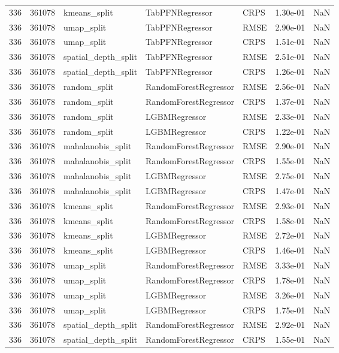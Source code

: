 \begin{tabular}{rrlllrr}
336 & 361078 & kmeans\_split & TabPFNRegressor & CRPS & 1.30e-01 & NaN \\
336 & 361078 & umap\_split & TabPFNRegressor & RMSE & 2.90e-01 & NaN \\
336 & 361078 & umap\_split & TabPFNRegressor & CRPS & 1.51e-01 & NaN \\
336 & 361078 & spatial\_depth\_split & TabPFNRegressor & RMSE & 2.51e-01 & NaN \\
336 & 361078 & spatial\_depth\_split & TabPFNRegressor & CRPS & 1.26e-01 & NaN \\
336 & 361078 & random\_split & RandomForestRegressor & RMSE & 2.56e-01 & NaN \\
336 & 361078 & random\_split & RandomForestRegressor & CRPS & 1.37e-01 & NaN \\
336 & 361078 & random\_split & LGBMRegressor & RMSE & 2.33e-01 & NaN \\
336 & 361078 & random\_split & LGBMRegressor & CRPS & 1.22e-01 & NaN \\
336 & 361078 & mahalanobis\_split & RandomForestRegressor & RMSE & 2.90e-01 & NaN \\
336 & 361078 & mahalanobis\_split & RandomForestRegressor & CRPS & 1.55e-01 & NaN \\
336 & 361078 & mahalanobis\_split & LGBMRegressor & RMSE & 2.75e-01 & NaN \\
336 & 361078 & mahalanobis\_split & LGBMRegressor & CRPS & 1.47e-01 & NaN \\
336 & 361078 & kmeans\_split & RandomForestRegressor & RMSE & 2.93e-01 & NaN \\
336 & 361078 & kmeans\_split & RandomForestRegressor & CRPS & 1.58e-01 & NaN \\
336 & 361078 & kmeans\_split & LGBMRegressor & RMSE & 2.72e-01 & NaN \\
336 & 361078 & kmeans\_split & LGBMRegressor & CRPS & 1.46e-01 & NaN \\
336 & 361078 & umap\_split & RandomForestRegressor & RMSE & 3.33e-01 & NaN \\
336 & 361078 & umap\_split & RandomForestRegressor & CRPS & 1.78e-01 & NaN \\
336 & 361078 & umap\_split & LGBMRegressor & RMSE & 3.26e-01 & NaN \\
336 & 361078 & umap\_split & LGBMRegressor & CRPS & 1.75e-01 & NaN \\
336 & 361078 & spatial\_depth\_split & RandomForestRegressor & RMSE & 2.92e-01 & NaN \\
336 & 361078 & spatial\_depth\_split & RandomForestRegressor & CRPS & 1.55e-01 & NaN \\

\end{tabular}
